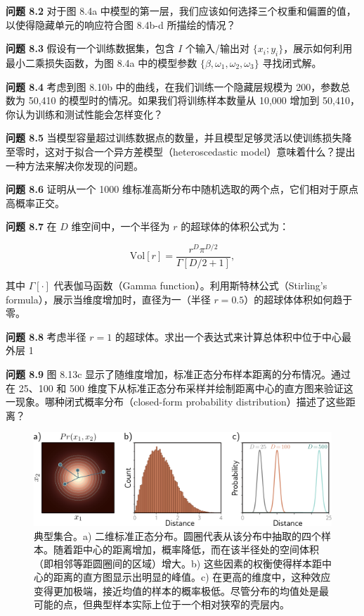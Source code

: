\textbf{问题 8.2} 对于图 8.4a 中模型的第一层，我们应该如何选择三个权重和偏置的值，以使得隐藏单元的响应符合图 8.4b-d 所描绘的情况？

\textbf{问题 8.3} 假设有一个训练数据集，包含 \( I \) 个输入/输出对 \( \{x_i; y_i\} \)，展示如何利用最小二乘损失函数，为图 8.4a 中的模型参数 \( \{\beta, \omega_1, \omega_2, \omega_3\} \) 寻找闭式解。

\textbf{问题 8.4} 考虑到图 8.10b 中的曲线，在我们训练一个隐藏层规模为 200，参数总数为 50,410 的模型时的情况。如果我们将训练样本数量从 10,000 增加到 50,410，你认为训练和测试性能会怎样变化？

\textbf{问题 8.5} 当模型容量超过训练数据点的数量，并且模型足够灵活以使训练损失降至零时，这对于拟合一个异方差模型（heteroscedastic model）意味着什么？提出一种方法来解决你发现的问题。

\textbf{问题 8.6} 证明从一个 1000 维标准高斯分布中随机选取的两个点，它们相对于原点高概率正交。

\textbf{问题 8.7} 在 \( D \) 维空间中，一个半径为 \( r \) 的超球体的体积公式为：

\begin{equation}
\text{Vol}[r] = \frac{r^D \pi^{D/2}}{\Gamma[D/2 + 1]}, 
\end{equation}

其中 \( \Gamma[\cdot] \) 代表伽马函数（Gamma function）。利用斯特林公式（Stirling's formula），展示当维度增加时，直径为一（半径 \( r=0.5 \)）的超球体体积如何趋于零。

\textbf{问题 8.8} 考虑半径 \( r = 1 \) 的超球体。求出一个表达式来计算总体积中位于中心最外层 1%

\textbf{问题 8.9} 图 8.13c 显示了随维度增加，标准正态分布样本距离的分布情况。通过在 25、100 和 500 维度下从标准正态分布采样并绘制距离中心的直方图来验证这一现象。哪种闭式概率分布（closed-form probability distribution）描述了这些距离？

\begin{figure}[ht!]
\centering
\includegraphics[width=0.7\linewidth]{png/chapter8/PerfTypical.png}
\caption{典型集合。a) 二维标准正态分布。圆圈代表从该分布中抽取的四个样本。随着距中心的距离增加，概率降低，而在该半径处的空间体积（即相邻等距圆圈间的区域）增大。b) 这些因素的权衡使得样本距中心的距离的直方图显示出明显的峰值。c) 在更高的维度中，这种效应变得更加极端，接近均值的样本的概率极低。尽管分布的均值处是最可能的点，但典型样本实际上位于一个相对狭窄的壳层内。}
\end{figure}

